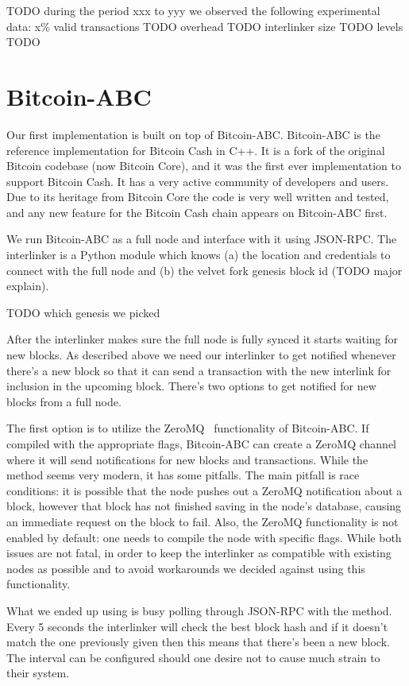 TODO during the period xxx to yyy we observed the following experimental data:
x\% valid transactions TODO
overhead TODO
interlinker size TODO
levels TODO

\section{Bitcoin-ABC}
Our first implementation is built on top of Bitcoin-ABC. Bitcoin-ABC is the reference implementation for Bitcoin Cash in C++. It is a fork of the original Bitcoin codebase (now Bitcoin Core), and it was the first ever implementation to support Bitcoin Cash. It has a very active community of developers and users. Due to its heritage from Bitcoin Core the code is very well written and tested, and any new feature for the Bitcoin Cash chain appears on Bitcoin-ABC first.

We run Bitcoin-ABC as a full node and interface with it using JSON-RPC. The interlinker is a Python module which knows (a) the location and credentials to connect with the full node and (b) the velvet fork genesis block id (TODO major explain).

TODO which genesis we picked

After the interlinker makes sure the full node is fully synced it starts waiting for new blocks. As described above we need our interlinker to get notified whenever there's a new block so that it can send a transaction with the new interlink for inclusion in the upcoming block. There's two options to get notified for new blocks from a full node.

The first option is to utilize the ZeroMQ~\cite{zmq} functionality of Bitcoin-ABC. If compiled with the appropriate flags, Bitcoin-ABC can create a ZeroMQ channel where it will send notifications for new blocks and transactions. While the method seems very modern, it has some pitfalls. The main pitfall is race conditions: it is possible that the node pushes out a ZeroMQ notification about a block, however that block has not finished saving in the node's database, causing an immediate  request on the block to fail. Also, the ZeroMQ functionality is not enabled by default: one needs to compile the node with specific flags. While both issues are not fatal, in order to keep the interlinker as compatible with existing nodes as possible and to avoid workarounds we decided against using this functionality.

What we ended up using is busy polling through JSON-RPC with the  method. Every 5 seconds the interlinker will check the best block hash and if it doesn't match the one previously given then this means that there's been a new block. The interval can be configured should one desire not to cause much strain to their system.

